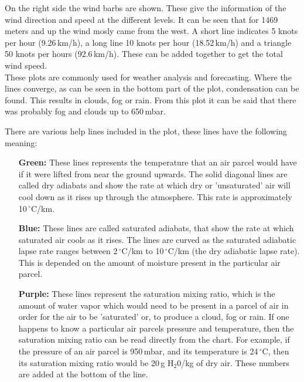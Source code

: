 \documentclass{article}
\begin{document}
On the right side the wind barbs are shown. These give the information of the wind direction and speed at the different levels. It can be seen that for 1469 meters and up the wind mosly came from the west. A short line indicates 5 knots per hour (9.26\,km/h), a long line 10 knots per hour (18.52\,km/h) and a triangle 50 knots per hours (92.6\,km/h). These can be added together to get the total wind speed. \\

These plots are commonly used for weather analysis and forecasting. Where the lines converge, as can be seen in the bottom part of the plot, condensation can be found. This results in clouds, fog or rain. From this plot it can be said that there was probably fog and clouds up to 650\,mbar.

\newpage
There are various help lines included in the plot, these lines have the following meaning:
\begin{enumerate}[leftmargin=2cm]
	\item[\textbf{Green:}]  These lines represents the temperature that an air parcel would have if it were lifted from near the ground upwards. The solid diagonal lines are called dry adiabats and show the rate at which dry or 'unsaturated' air will cool down as it rises up through the atmosphere. This rate is approximately 10\,$^\circ$C/km. 
	\item[\textbf{Blue:}]   These lines are called saturated adiabats, that show the rate at which saturated air cools as it rises.  The lines are curved as the saturated adiabatic lapse rate ranges between 2\,$^\circ$C/km to 10\,$^\circ$C/km (the dry adiabatic lapse rate). This is depended on the amount of moisture present in the particular air parcel.
	\item[\textbf{Purple:}] These lines represent the saturation mixing ratio, which is the amount of water vapor which would need to be present in a parcel of air in order for the air to be 'saturated' or, to produce a cloud, fog or rain. If one happens to know a particular air parcels pressure and temperature, then the saturation mixing ratio can be read directly from the chart.  For example, if the pressure of an air parcel is 950\,mbar, and its temperature is 24\,$^\circ$C, then its saturation mixing ratio would be 20\,g H$_2$0/kg of dry air. These numbers are added at the bottom of the line.
\end{enumerate}






\newpage				%


\end{document}
